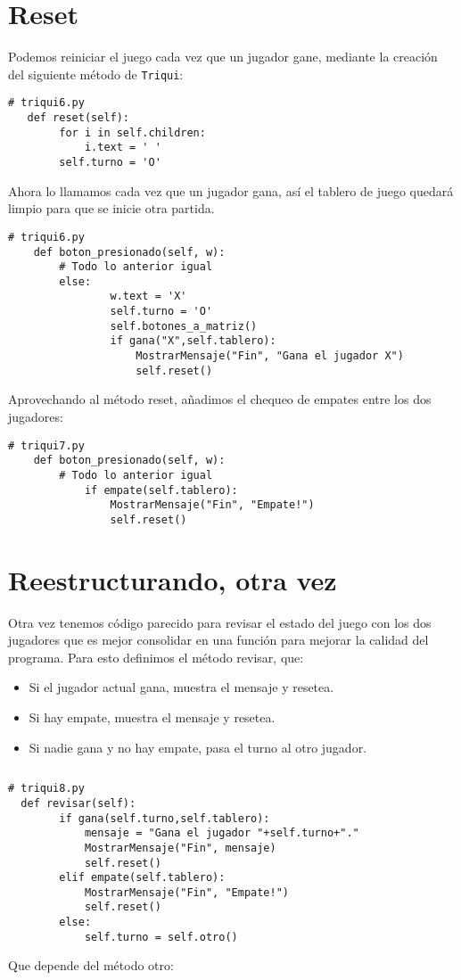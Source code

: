 \section{Reset}

Podemos reiniciar el juego cada vez que un jugador gane, mediante
la creación del siguiente método de \texttt{Triqui}:

\begin{lstlisting}
# triqui6.py
   def reset(self):
        for i in self.children:
            i.text = ' '
        self.turno = 'O'
\end{lstlisting}
Ahora lo llamamos cada vez que un jugador gana, así el tablero de
juego quedará limpio para que se inicie otra partida.

\begin{lstlisting}
# triqui6.py
    def boton_presionado(self, w):
        # Todo lo anterior igual
        else:
                w.text = 'X'
                self.turno = 'O'
                self.botones_a_matriz()
                if gana("X",self.tablero):
                    MostrarMensaje("Fin", "Gana el jugador X")
                    self.reset()
\end{lstlisting}
Aprovechando al método reset, añadimos el chequeo de empates entre
los dos jugadores:

\begin{lstlisting}
# triqui7.py
    def boton_presionado(self, w):
        # Todo lo anterior igual
            if empate(self.tablero):
                MostrarMensaje("Fin", "Empate!")
                self.reset()
\end{lstlisting}
\section{Reestructurando, otra vez}

Otra vez tenemos código parecido para revisar el estado del juego
con los dos jugadores que es mejor consolidar en una función para
mejorar la calidad del programa. Para esto definimos el método revisar,
que:
\begin{itemize}
\item Si el jugador actual gana, muestra el mensaje y resetea.
\item Si hay empate, muestra el mensaje y resetea.
\item Si nadie gana y no hay empate, pasa el turno al otro jugador. 
\end{itemize}
\begin{verbatim}

\end{verbatim}
\begin{lstlisting}
# triqui8.py
  def revisar(self):          
        if gana(self.turno,self.tablero):
            mensaje = "Gana el jugador "+self.turno+"."
            MostrarMensaje("Fin", mensaje)
            self.reset()
        elif empate(self.tablero):
            MostrarMensaje("Fin", "Empate!")
            self.reset()
        else:
            self.turno = self.otro()
\end{lstlisting}
Que depende del método otro:

